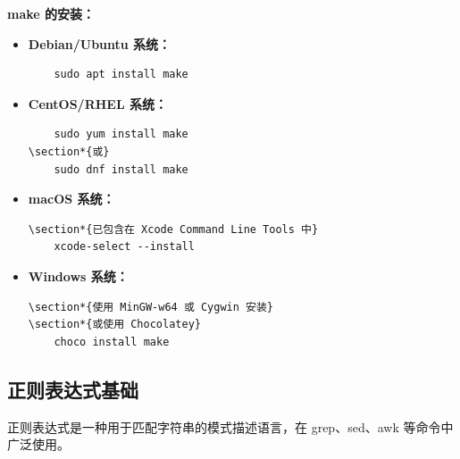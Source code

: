 \documentclass[12pt,UTF8]{ctexbook}
\begin{document}
\textbf{make 的安装：}
\begin{itemize}
    \item \textbf{Debian/Ubuntu 系统：}
    \begin{verbatim}
    sudo apt install make
    \end{verbatim}
    \item \textbf{CentOS/RHEL 系统：}
    \begin{verbatim}
    sudo yum install make
\section*{或}
    sudo dnf install make
    \end{verbatim}
    \item \textbf{macOS 系统：}
    \begin{verbatim}
\section*{已包含在 Xcode Command Line Tools 中}
    xcode-select --install
    \end{verbatim}
    \item \textbf{Windows 系统：}
    \begin{verbatim}
\section*{使用 MinGW-w64 或 Cygwin 安装}
\section*{或使用 Chocolatey}
    choco install make
    \end{verbatim}
\end{itemize}

\subsection{正则表达式基础}
正则表达式是一种用于匹配字符串的模式描述语言，在 grep、sed、awk 等命令中广泛使用。
\end{document}
